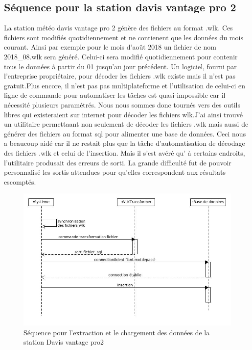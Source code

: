 \subsection{Séquence pour la station davis vantage pro 2} 
La station météo davis vantage pro 2 génère des fichiers au format .wlk. Ces fichiers sont modifiés quotidiennement et ne contienent que les données du mois courant. Ainsi par exemple pour le mois d’août 2018 un fichier de nom 2018\_08.wlk sera généré. Celui-ci sera modifié quotidiennement pour contenir tous le données à partir du 01 jusqu’au jour précédent. Un logiciel, fourni par l’entreprise propriétaire, pour décoder les fichiers .wlk existe mais il n’est pas gratuit.Plus encore, il n’est pas pas multiplateforme et l’utilisation de celui-ci en ligne de commande pour automatiser les tâches est quasi-impossible car il nécessité plusieurs paramétrés. Nous nous sommes donc tournés vers des outils libres qui existeraient sur internet pour décoder les fichiers wlk.J'ai ainsi trouvé un utilitaire permettaant non seulement de décoder les fichiers .wlk mais aussi de générer des fichiers au format sql pour alimenter une base de données. Ceci nous a beaucoup aidé car il ne restait plus que la tâche d'automatisation  de décodage des fichiers .wlk et celui de l’insertion. Mais il s’est avéré qu' à certains endroits, l’utilitaire produsait des erreurs de sorti. La grande difficulté fut de pouvoir personnalisé les sortis attendues pour qu’elles correspondent aux résultats escomptés. 

\begin{figure}
    
    \centering
     \includegraphics[width=.7\textwidth]{images/davis_senquence_diagrame.jpg}
     \caption{ Séquence pour l'extraction et le chargement des données de la station Davis vantage pro2}
     \label{diagramme de séquence station sencrop}
\end{figure}


